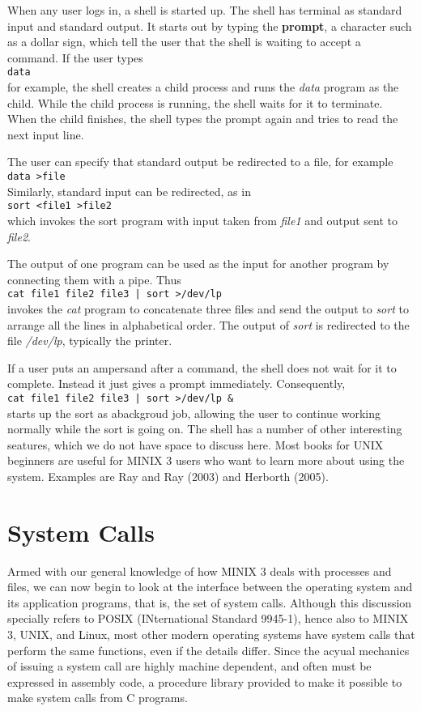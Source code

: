 \documentclass{book}
\newcommand {\kw}  [1] {\textbf{#1}}
\newcommand {\sys} [1] {\textsl{#1}}
\newcommand {\cmd} [1] {\texttt{#1}}
\begin{document}
When any user logs in, a shell is started up.
The shell has terminal as standard input and standard output.
It starts out by typing the \kw{prompt}, a character such as a dollar sign, 
which tell the user that the shell is waiting to accept a command.
If the user types\\
\cmd{data}\\
for example, the shell creates a child process and runs the \sys{data} program as the child.
While the child process is running, the shell waits for it to terminate.
When the child finishes, the shell types the prompt again and tries to read the next input line.

The user can specify that standard output be redirected to a file, for example\\
\cmd{data >file}\\
Similarly, standard input can be redirected, as in\\
\cmd{sort <file1 >file2}\\
which invokes the sort program with input taken from \sys{file1} and output sent to \sys{file2}.

The output of one program can be used as the input for another program by connecting them with a pipe. Thus\\
\cmd{cat file1 file2 file3 | sort >/dev/lp}\\
invokes the \sys{cat} program to concatenate three files and send the output to \sys{sort} to arrange all the lines in alphabetical order.
The output of \sys{sort} is redirected to the file \sys{/dev/lp}, typically the printer.

If a user puts an ampersand after a command, the shell does not wait for it to complete.
Instead it just gives a prompt immediately. Consequently,\\
\cmd{cat file1 file2 file3 | sort >/dev/lp \&}\\
starts up the sort as abackgroud job, allowing the user to continue working normally while the sort is going on.
The shell has a number of other interesting seatures, which we do not have space to discuss here.
Most books for UNIX beginners are useful for MINIX 3 users who want to learn more about using the system.
Examples are Ray and Ray (2003) and Herborth (2005).

\section{System Calls}
Armed with our general knowledge of how MINIX 3 deals with processes and files, 
we can now begin to look at the interface between the operating system and its application programs, that is, the set of system calls.
Although this discussion specially refers to POSIX (INternational Standard 9945-1), hence also to MINIX 3, UNIX, and Linux, 
most other modern operating systems have system calls that perform the same functions, even if the details differ.
Since the acyual mechanics of issuing a system call are highly machine dependent, and often must be expressed in assembly code, 
a procedure library provided to make it possible to make system calls from C programs.
\end{document}
